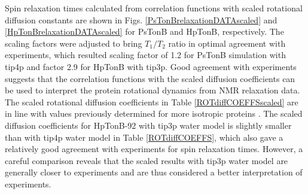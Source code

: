 \documentclass[pre,aps,floatfix,authordate1-4,twocolumn]{revtex4-1}
\begin{document}
Spin relaxation times calculated from correlation functions with scaled
rotational diffusion constants are shown in Figs. \ref{PsTonBrelaxationDATAscaled} and
\ref{HpTonBrelaxationDATAscaled} for PsTonB and HpTonB, respectively.
The scaling factors were adjusted to bring $T_1/T_2$ ratio in optimal
agreement with experiments, which resulted scaling factor of 1.2 for
PsTonB simulation with tip4p and factor 2.9 for HpTonB with tip3p.
Good agreement with experiments suggests that the correlation functions
with the scaled diffusion coefficients can be used to interpret the
protein rotational dynamics from NMR relaxation data.
The scaled rotational diffusion coefficients in Table \ref{ROTdiffCOEFFSscaled}
are in line with values previously determined for more isotropic proteins \cite{krishnan98}.
The scaled diffusion coefficients for HpTonB-92 with tip3p water model
is slightly smaller than with tip4p water model in Table \ref{ROTdiffCOEFFS}, which also
gave a relatively good agreement with experiments for spin relaxation times. However,
a careful comparison reveals that the scaled results with tip3p water model are generally
closer to experiments and are thus considered a better interpretation of experiments.
\end{document}
